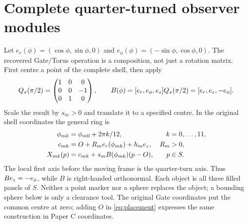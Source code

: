 \section{Complete quarter-turned observer modules}\label{sec:placement}
Let $e_r(\phi)=(\cos\phi,\sin\phi,0)$ and $e_\phi(\phi)=(-\sin\phi,\cos\phi,0)$. The recovered Gate/Torus operation is a composition, not just a rotation matrix. First centre a point of the complete shell, then apply
\begin{equation}\label{eq:frames}
Q_x(\pi/2)=\begin{pmatrix}1&0&0\\0&0&-1\\0&1&0\end{pmatrix},\qquad
B(\phi)=[e_r,e_\phi,e_z]Q_x(\pi/2)=[e_r,e_z,-e_\phi].
\end{equation}
Scale the result by $s_m>0$ and translate it to a specified centre. In the original shell coordinates the general ring is
\begin{equation}\label{eq:placement}
\begin{aligned}
\phi_{mk}&=\phi_{m0}+2\pi k/12,& k&=0,\ldots,11,\\
c_{mk}&=O+R_m e_r(\phi_{mk})+h_me_z,& R_m&>0,\\
X_{mk}(p)&=c_{mk}+s_m B(\phi_{mk})(p-O),&p&\in S.
\end{aligned}
\end{equation}
The local first axis before the moving frame is the quarter-turn axis. Thus $Be_z=-e_\phi$, while $B$ is right-handed orthonormal. Each object is all three filled panels of $S$. Neither a point marker nor a sphere replaces the object; a bounding sphere below is only a clearance tool. The original Gate coordinates put the common centre at zero; adding $O$ in \eqref{eq:placement} expresses the same construction in Paper C coordinates.~\cite[Sec.~6]{Gate}

